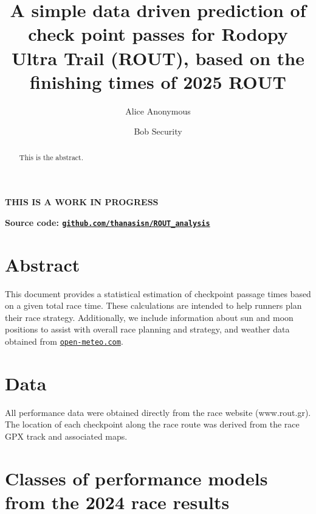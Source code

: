 \documentclass[]{elsarticle} %
\begin{document}
\begin{frontmatter}

  \title{A simple data driven prediction of check point passes for
Rodopy Ultra Trail (ROUT), based on the finishing times of 2025 ROUT}
    \author[Some Institute of Technology]{Alice Anonymous%
  }
    \author[Another University]{Bob Security%
  }
  
  \begin{abstract}
  This is the abstract.
  \end{abstract}
  
 \end{frontmatter}

\FloatBarrier

\textbf{THIS IS A WORK IN PROGRESS}

\textbf{Source code:
\href{https://github.com/thanasisn/ROUT_analysis}{\texttt{github.com/thanasisn/ROUT\_analysis}}}

\section{Abstract}\label{abstract}

This document provides a statistical estimation of checkpoint passage
times based on a given total race time. These calculations are intended
to help runners plan their race strategy. Additionally, we include
information about sun and moon positions to assist with overall race
planning and strategy, and weather data obtained from
\href{https://open-meteo.com/}{\texttt{open-meteo.com}}.

\FloatBarrier

\section{Data}\label{data}

All performance data were obtained directly from the race website
(www.rout.gr). The location of each checkpoint along the race route was
derived from the race GPX track and associated maps.

\section{Classes of performance models from the 2024 race
results}\label{classes-of-performance-models-from-the-2024-race-results}
\end{document}
